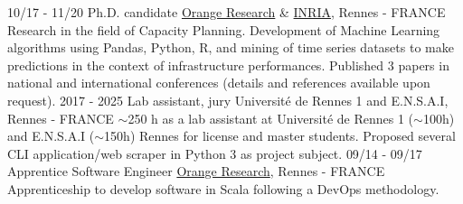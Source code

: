 \documentclass[]{friggeri-cv}
\begin{document}
\begin{entrylist}
{  }
  \entry
  {10/17 - 11/20}
  {Ph.D. candidate}
  {\href{http://www.orange.com/en/home}{Orange Research} \& \href{https://www.inria.fr/fr}{INRIA}, Rennes - FRANCE}
  {Research in the field of Capacity Planning.
    Development of Machine Learning algorithms using Pandas, Python, R, and mining of time series datasets to make predictions in the context of infrastructure performances.
    Published 3 papers in national and international conferences (details and references available upon request).
  }
  \entry
  {2017 - 2025}
  {Lab assistant, jury}
  {Université de Rennes 1 and E.N.S.A.I, Rennes - FRANCE}
  {$\sim$250 h as a lab assistant at Université de Rennes 1 ($\sim$100h) and E.N.S.A.I ($\sim$150h) Rennes for license and master students.
    Proposed several CLI application/web scraper in Python 3 as project subject.
  }
  \entry
  {09/14 - 09/17}
  {Apprentice Software Engineer}
  {\href{http://www.orange.com/en/home}{Orange Research}, Rennes - FRANCE}
  {Apprenticeship to develop software in Scala following a DevOps methodology.%
  }
  \vspace{-2.5em}
\end{entrylist}

\end{document}
